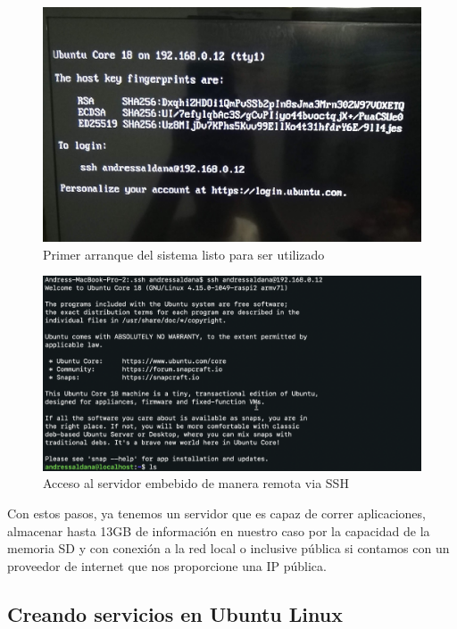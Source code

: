 \begin{figure}[H]
	\centering
	\includegraphics[scale=.15]{Capitulo5/images/first_boot.jpg}
	\caption{Primer arranque del sistema listo para ser utilizado}
	\label{fig:primer arranque}
\end{figure} 

\begin{figure}[H]
	\centering
	\includegraphics[scale=.3]{Capitulo5/images/login.png}
	\caption{Acceso al servidor embebido de manera remota via SSH}
	\label{fig:login}
\end{figure} 


Con estos pasos, ya tenemos un servidor que es capaz de correr aplicaciones, almacenar hasta 13GB de información en nuestro caso por la capacidad de la memoria SD y con conexión a la red local o inclusive pública si contamos con un proveedor de internet que nos proporcione una IP pública.


\subsection{Creando servicios en Ubuntu Linux}

